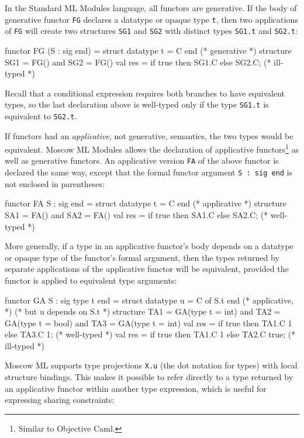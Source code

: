 \documentclass[fleqn,a4paper]{article}
\begin{document}
In the Standard ML Modules language, all functors are generative.  If
the body of generative functor \texttt{FG} declares a datatype 
or opaque type
\texttt{t}, then two applications of \texttt{FG} will create two
structures \texttt{SG1} and \texttt{SG2} with distinct types
\texttt{SG1.t} and \texttt{SG2.t}:

\begin{program}
functor FG (S : sig end) = struct datatype t = C end    (* generative  *)
structure SG1 = FG() and SG2 = FG()
val res = if true then SG1.C else SG2.C;                (* ill-typed   *)
\end{program}

\noindent
Recall that a conditional expression requires both branches to have
equivalent types, so the last declaration above is well-typed only if the
type \texttt{SG1.t} is equivalent to \texttt{SG2.t}.

If functors had an \emph{applicative}, not generative,
semantics, the two types would be equivalent. 
Moscow ML Modules allows the declaration of applicative
functors\footnote{Similar to Objective Caml.} as well as generative
functors.  An applicative version \texttt{FA} of the above functor is
declared the same way, except that the formal functor argument
\texttt{S :\ sig end} is not enclosed in parentheses:

\begin{program}
functor FA S : sig end = struct datatype t = C end      (* applicative *)
structure SA1 = FA() and SA2 = FA() 
val res = if true then SA1.C else SA2.C;                (* well-typed  *)
\end{program}

\noindent
More generally, if a type in an applicative functor's body depends on
a datatype or opaque type of the functor's formal argument, then the
types returned by separate applications of the applicative functor
will be equivalent, provided the functor is applied to equivalent type
arguments:
\begin{program}
functor GA S : sig type t end = struct datatype u = C of S.t end  (* applicative, *) 
                                                                  (* but u depends on S.t *)
structure TA1 = GA(type t = int) and TA2 = GA(type t = bool) and TA3 = GA(type t = int)
val res = if true then TA1.C 1 else TA3.C 1;            (* well-typed *)
val res = if true then TA1.C 1 else TA2.C true;         (* ill-typed  *)
\end{program}

\noindent 
Moscow ML supports type projections \texttt{X.u} (the dot notation for
types) with local structure bindings.  This makes it possible to refer
directly to a type returned by an applicative functor within another
type expression, which is useful for expressing sharing constraints:
\end{document}

